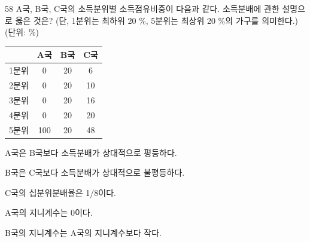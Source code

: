 \begin{question}{58}
A국, B국, C국의 소득분위별 소득점유비중이 다음과 같다. 소득분배에 관한 설명으로 옳은 것은? (단, 1분위는 최하위 20 \%, 5분위는 최상위 20 \%의 가구를 의미한다.)
\hfill(단위: \%)\par
{\small\centering\begin{tabular}{|c|c|c|c|}\hline
 & A국 & B국 & C국 \\ \hline
1분위 & 0 & 20 & 6 \\ \hline
2분위 & 0 & 20 & 10 \\ \hline
3분위 & 0 & 20 & 16 \\ \hline
4분위 & 0 & 20 & 20 \\ \hline
5분위 & 100 & 20 & 48 \\ \hline
\end{tabular}\par}
\begin{choices}
  \item A국은 B국보다 소득분배가 상대적으로 평등하다.
  \item B국은 C국보다 소득분배가 상대적으로 불평등하다.
  \item C국의 십분위분배율은 1/8이다.
  \item A국의 지니계수는 0이다.
  \item B국의 지니계수는 A국의 지니계수보다 작다.
\end{choices}
\end{question}
